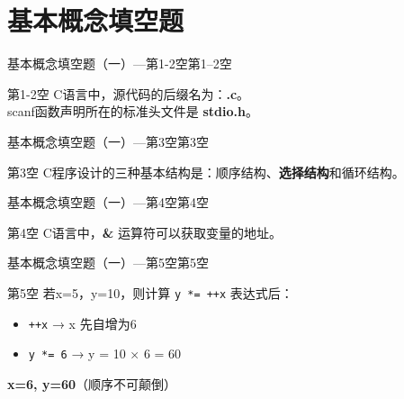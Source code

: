 \section{基本概念填空题}

\begin{frame}{基本概念填空题（一）---第1-2空}{第1--2空}
    \begin{exampleblock}{第1-2空}
        C语言中，源代码的后缀名为：\textbf{.c}。\\
        scanf函数声明所在的标准头文件是 \textbf{stdio.h}。
    \end{exampleblock}
\end{frame}

\begin{frame}{基本概念填空题（一）---第3空}{第3空}
    \begin{exampleblock}{第3空}
        C程序设计的三种基本结构是：顺序结构、\textbf{选择结构}和循环结构。
    \end{exampleblock}
\end{frame}

\begin{frame}{基本概念填空题（一）---第4空}{第4空}
    \begin{exampleblock}{第4空}
        C语言中，\textbf{\&} 运算符可以获取变量的地址。
    \end{exampleblock}
\end{frame}

\begin{frame}{基本概念填空题（一）---第5空}{第5空}
    \begin{exampleblock}{第5空}
        若x=5，y=10，则计算 \texttt{y *= ++x} 表达式后：
        \begin{itemize}
            \item \texttt{++x} → x 先自增为6
            \item \texttt{y *= 6} → y = 10 × 6 = 60
        \end{itemize}
        \textbf{x=6, y=60}（顺序不可颠倒）
    \end{exampleblock}
\end{frame}

